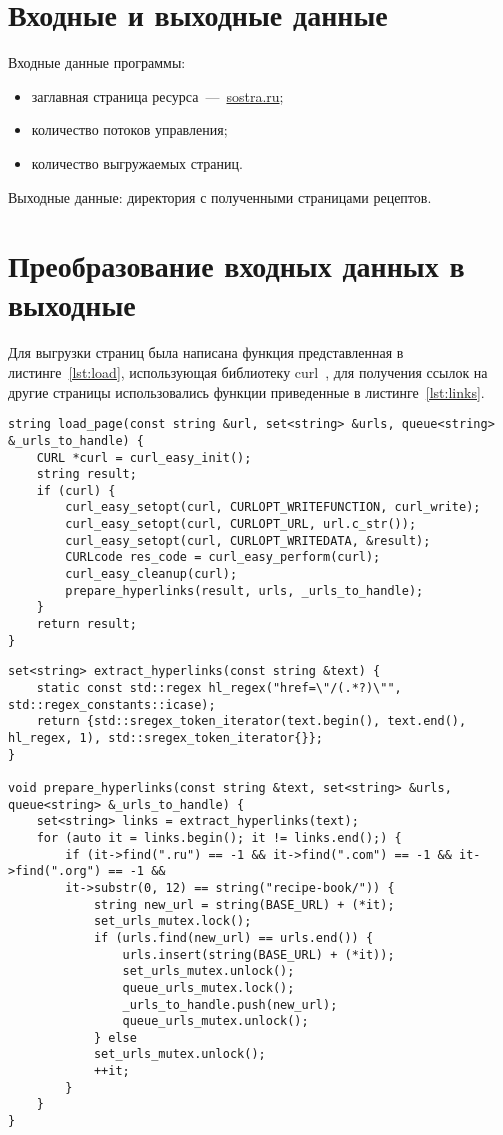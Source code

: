 \chapter{Входные и выходные данные}

Входные данные программы:
\begin{itemize}
	\item заглавная страница ресурса~---~\url{sostra.ru};
	\item количество потоков управления;
	\item количество выгружаемых страниц.
\end{itemize}

Выходные данные: директория с полученными страницами рецептов.
\clearpage

\chapter{Преобразование входных данных в выходные}

Для выгрузки страниц была написана функция представленная в листинге~\ref{lst:load}, использующая библиотеку curl~\cite{curl}, для получения ссылок на другие страницы использовались функции приведенные в листинге~\ref{lst:links}.
\begin{lstlisting}[caption={Функция выгрузки страниц}, label=lst:load]
string load_page(const string &url, set<string> &urls, queue<string> &_urls_to_handle) {
	CURL *curl = curl_easy_init();
	string result;
	if (curl) {
		curl_easy_setopt(curl, CURLOPT_WRITEFUNCTION, curl_write);
		curl_easy_setopt(curl, CURLOPT_URL, url.c_str());
		curl_easy_setopt(curl, CURLOPT_WRITEDATA, &result);
		CURLcode res_code = curl_easy_perform(curl);
		curl_easy_cleanup(curl);
		prepare_hyperlinks(result, urls, _urls_to_handle);
	}
	return result;
}
\end{lstlisting}

\begin{lstlisting}[caption={Функции выделения ссылок}, label=lst:links]
set<string> extract_hyperlinks(const string &text) {
	static const std::regex hl_regex("href=\"/(.*?)\"", std::regex_constants::icase);
	return {std::sregex_token_iterator(text.begin(), text.end(), hl_regex, 1), std::sregex_token_iterator{}};
}

void prepare_hyperlinks(const string &text, set<string> &urls, queue<string> &_urls_to_handle) {
	set<string> links = extract_hyperlinks(text);
	for (auto it = links.begin(); it != links.end();) {
		if (it->find(".ru") == -1 && it->find(".com") == -1 && it->find(".org") == -1 &&
		it->substr(0, 12) == string("recipe-book/")) {
			string new_url = string(BASE_URL) + (*it);
			set_urls_mutex.lock();
			if (urls.find(new_url) == urls.end()) {
				urls.insert(string(BASE_URL) + (*it));
				set_urls_mutex.unlock();
				queue_urls_mutex.lock();
				_urls_to_handle.push(new_url);
				queue_urls_mutex.unlock();
			} else
			set_urls_mutex.unlock();
			++it;
		}
	}
}
\end{lstlisting}

